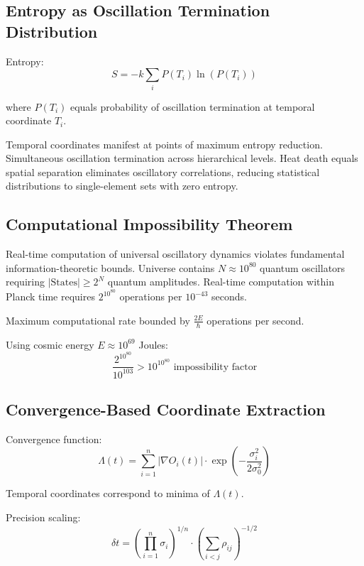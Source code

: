 \documentclass[12pt,a4paper]{article}
\begin{document}
\subsection{Entropy as Oscillation Termination Distribution}

Entropy:
\begin{equation}
S = -k \sum_i P(T_i) \ln(P(T_i))
\end{equation}

where $P(T_i)$ equals probability of oscillation termination at temporal coordinate $T_i$.

Temporal coordinates manifest at points of maximum entropy reduction. Simultaneous oscillation termination across hierarchical levels. Heat death equals spatial separation eliminates oscillatory correlations, reducing statistical distributions to single-element sets with zero entropy.

\subsection{Computational Impossibility Theorem}

Real-time computation of universal oscillatory dynamics violates fundamental information-theoretic bounds. Universe contains $N \approx 10^{80}$ quantum oscillators requiring $|\text{States}| \geq 2^N$ quantum amplitudes. Real-time computation within Planck time requires $2^{10^{80}}$ operations per $10^{-43}$ seconds.

Maximum computational rate bounded by $\frac{2E}{\hbar}$ operations per second.

Using cosmic energy $E \approx 10^{69}$ Joules:
\begin{equation}
\frac{2^{10^{80}}}{10^{103}} > 10^{10^{80}} \text{ impossibility factor}
\end{equation}

\subsection{Convergence-Based Coordinate Extraction}

Convergence function:
\begin{equation}
\Lambda(t) = \sum_{i=1}^{n} |\nabla O_i(t)| \cdot \exp\left(-\frac{\sigma_i^2}{2\sigma_0^2}\right)
\end{equation}

Temporal coordinates correspond to minima of $\Lambda(t)$.

Precision scaling:
\begin{equation}
\delta t = \left(\prod_{i=1}^{n} \sigma_i\right)^{1/n} \cdot \left(\sum_{i<j} \rho_{ij}\right)^{-1/2}
\end{equation}
\end{document}
